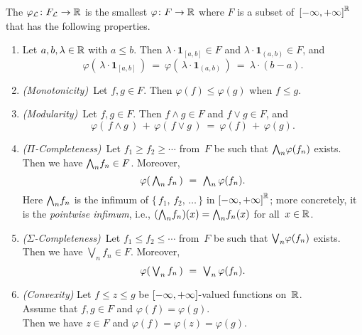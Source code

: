 \begin{dfn}
\label{D:lebesgue-integral}
The 
$\varphi_{\mathcal{L}} \colon F_{\mathcal{L}} \rightarrow \mathbb{R}$
is the smallest  $\varphi\colon F \rightarrow \mathbb{R}$
where $F$ is a subset of~${[-\infty,+\infty]}^{\mathbb{R}}$
that has the following properties.
\begin{enumerate}
\item
\label{prop:integral-1}
Let $a,b,\lambda\in\mathbb{R}$ with $a\leq b$. 
Then $\lambda\cdot\mathbf{1}_{[a,b]}\in F$
and $\lambda\cdot\mathbf{1}_{(a,b)}\in F$,
and
\begin{equation*}
\varphi(\,\lambda\cdot \mathbf{1}_{[a,b]}\,)
\ =\ \varphi(\,\lambda\cdot \mathbf{1}_{(a,b)}\,)
\ =\ \lambda\cdot(b-a).
\end{equation*}

\item
\label{prop:integral-2}
\textit{(Monotonicity)}\ 
Let $f,g\in F$.
Then $\varphi(f)\leq \varphi(g)$
when  $f\leq g$.

\item
\label{prop:integral-3}
\textit{(Modularity)}\ 
Let $f,g\in F$.
Then $f\wedge g\in F$ and $f \vee g \in F$, and
\begin{equation*}
\varphi(\,f\wedge g\,)\,+\,\varphi(\,f\vee g\,)\ =\ \varphi(f)\,+\,\varphi(g).
\end{equation*}

\item
\label{prop:integral-4}
\textit{($\Pi$-Completeness)}\ 
Let $f_1 \geq f_2 \geq \dotsb$
from~$F$ be such that $\textstyle{\bigwedge}_n \varphi(f_n)$ exists.\\
Then we have $\textstyle{\bigwedge}_n f_n \in F$.
Moreover,
\begin{equation*}
\varphi(\, \textstyle{ \bigwedge_n f_n }\,) \ =\ \textstyle{\bigwedge}_n \,\varphi(f_n).
\end{equation*}
Here $\textstyle{\bigwedge}_n f_n$
is the infimum of $\{\,f_1,\,f_2,\,\dotsc\,\}$ in ${[-\infty,+\infty]}^{\mathbb{R}}$;
more concretely,
it is the \emph{pointwise infimum}, i.e., $(\textstyle{\bigwedge}_n f_n)(x) = \textstyle{\bigwedge}_n f_n(x)$
for all~$x\in \mathbb{R}$.

\item
\label{prop:integral-5}
\textit{($\Sigma$-Completeness)}\ 
Let $f_1 \leq f_2 \leq \dotsb$
from~$F$ 
be such that $\textstyle{\bigvee}_n \varphi(f_n)$ exists.\\
Then we have $\bigvee_n f_n \in F$.
Moreover,
\begin{equation*}
\varphi(\, \textstyle{ \bigvee_n f_n }\,) \ =\ \textstyle{\bigvee}_n \,\varphi(f_n).
\end{equation*}

\item
\label{prop:integral-6}
\textit{(Convexity)}
Let $f\leq z \leq g$ be ${[-\infty,+\infty]}$-valued functions on~$\mathbb{R}$.\\
Assume that $f,g\in F$ and $\varphi(f)=\varphi(g)$.\\
Then we have $z\in F$ and $\varphi(f) = \varphi(z)= \varphi(g)$.
\end{enumerate}
\end{dfn}



